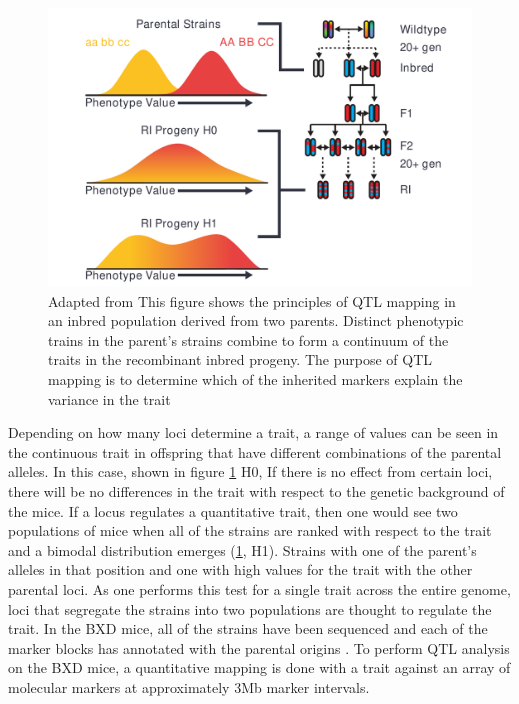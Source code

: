 \documentclass[a4paper,11pt,twoside]{book}
\begin{document}
	\begin{figure}[ht!]
		\includegraphics[width=\linewidth]{QTL_Results/QTL_Introduction.pdf}
		\caption{Adapted from \citep{Williams2017ResourcesGenetics} This figure shows the principles of QTL mapping in an inbred population derived from two parents. Distinct phenotypic trains in the parent's strains combine to form a continuum of the traits in the recombinant inbred progeny. The purpose of QTL mapping is to determine which of the inherited markers explain the variance in the trait}
		\label{fig:QTL Explanation}
	\end{figure}
	
    Depending on how many loci determine a trait, a range of values can be seen in the continuous trait in offspring that have different combinations of the parental alleles. In this case, shown in figure \ref{fig:QTL Explanation} H0, If there is no effect from certain loci, there will be no differences in the trait with respect to the genetic background of the mice. If a locus regulates a quantitative trait, then one would see two populations of mice when all of the strains are ranked with respect to the trait and a bimodal distribution emerges (\ref{fig:QTL Explanation}, H1). Strains with one of the parent's alleles in that position and one with high values for the trait with the other parental loci\citep{Mackay2009TheProspects}. As one performs this test for a single trait across the entire genome, loci that segregate the strains into two populations are thought to regulate the trait. In the BXD mice, all of the strains have been sequenced and each of the marker blocks has annotated with the parental origins \citep{Mulligan2017GeneNetworkGenetics}.  To perform QTL analysis on the BXD mice, a quantitative mapping is done with a trait against an array of molecular markers at approximately 3Mb marker intervals. 
	
\end{document}
